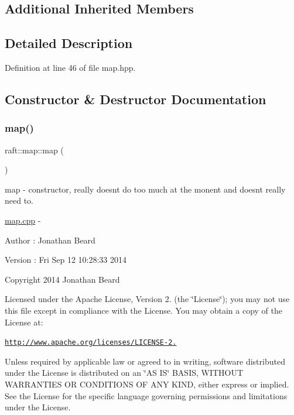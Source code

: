 \subsection*{Additional Inherited Members}


\subsection{Detailed Description}


Definition at line 46 of file map.\+hpp.



\subsection{Constructor \& Destructor Documentation}
\hypertarget{classraft_1_1map_a058ea3b55858b74bf837cda1058d14fe}{}\label{classraft_1_1map_a058ea3b55858b74bf837cda1058d14fe} 
\subsubsection{\texorpdfstring{map()}{map()}}
{\footnotesize\ttfamily raft\+::map\+::map (\begin{DoxyParamCaption}{ }\end{DoxyParamCaption})}

map -\/ constructor, really doesn\textquotesingle{}t do too much at the monent and doesn\textquotesingle{}t really need to.

\hyperlink{map_8cpp_source}{map.\+cpp} -\/ \begin{DoxyAuthor}{Author}
\+: Jonathan Beard 
\end{DoxyAuthor}
\begin{DoxyVersion}{Version}
\+: Fri Sep 12 10\+:28\+:33 2014
\end{DoxyVersion}
Copyright 2014 Jonathan Beard

Licensed under the Apache License, Version 2. (the \char`\"{}\+License\char`\"{}); you may not use this file except in compliance with the License. You may obtain a copy of the License at\+:

\href{http://www.apache.org/licenses/LICENSE-2.0}{\tt http\+://www.\+apache.\+org/licenses/\+L\+I\+C\+E\+N\+S\+E-\/2.}

Unless required by applicable law or agreed to in writing, software distributed under the License is distributed on an \char`\"{}\+A\+S I\+S\char`\"{} B\+A\+S\+IS, W\+I\+T\+H\+O\+UT W\+A\+R\+R\+A\+N\+T\+I\+ES OR C\+O\+N\+D\+I\+T\+I\+O\+NS OF A\+NY K\+I\+ND, either express or implied. See the License for the specific language governing permissions and limitations under the License. 

